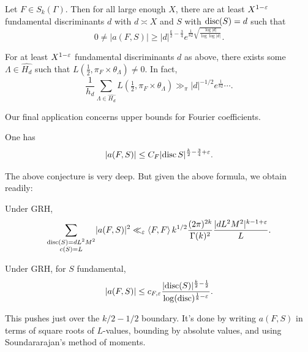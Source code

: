 \documentclass[reqno]{amsart} 
\begin{document}
\begin{theorem} \label{theorem:cnfg5kcowe}
  Let $F \in S_k(\Gamma)$.  Then for all large enough $X$, there are at least $X^{1 - \varepsilon}$ fundamental discriminants $d$ with $d \asymp X$ and $S$ with $\operatorname{disc}(S) = d$ such that
  \begin{equation*}
    0 \neq \lvert a(F, S) \rvert \geq \lvert d \rvert^{\frac{k}{2} - \frac{3}{4}}
    e^{\frac{1}{82} \sqrt{\frac{\log \lvert d \rvert}{\log \log \lvert d \rvert}}}.    
  \end{equation*}
\end{theorem}
\begin{corollary}\label{corollary:cnfg5kcqax}
  For at least $X^{1 - \varepsilon}$ fundamental discriminants $d$ as above, there exists some $\Lambda \in \widehat{H_d}$ such that $L(\tfrac{1}{2}, \pi_F \times \theta_\Lambda) \neq 0$.  In fact,
  \begin{equation*}
    \frac{1}{h_d } \sum_{\Lambda \in \widehat{H_d}} L(\tfrac{1}{2}, \pi_F \times \theta_\Lambda) \gg_\pi \lvert d \rvert^{-1/2} e^{\frac{1}{82}} \dotsb.
  \end{equation*}
\end{corollary}

Our final application concerns upper bounds for Fourier coefficients.
\begin{conjecture}\label{conjecture:cnfg5ktz3k}
  One has
  \begin{equation*}
    \left\lvert a(F, S) \right\rvert \leq C_F \lvert \operatorname{disc} S \rvert^{\frac{k}{2} - \frac{3}{4} + \varepsilon}.
  \end{equation*}
\end{conjecture}
The above conjecture is very deep.  But given the above formula, we obtain readily:
\begin{theorem}\label{theorem:cnfg5nd8f6}
  Under GRH,
  \begin{equation*}
    \sum_{
      \substack{
        \operatorname{disc}(S) = d L^2 M^2 
        \\
        c(S) = L        
      }
    }
    \lvert a(F, S) \rvert^2
    \ll_\varepsilon \left\langle F, F \right\rangle k^{1/2} \frac{(2 \pi )^{2 k }}{\Gamma(k)^2 }
    \frac{\lvert d L^2 M^2 \rvert^{k - 1 + \varepsilon }}{L}.
  \end{equation*}
\end{theorem}

\begin{theorem}\label{theorem:cnfg5nkh9a}
  Under GRH, for $S$ fundamental,
  \begin{equation*}
    \lvert a(F, S) \rvert \leq c_{F, \varepsilon } \frac{\lvert \operatorname{disc} (S) \rvert^{\frac{k}{2} - \frac{1}{2}}}{\log(\operatorname{disc})^{\frac{1}{8} - \varepsilon}}.
  \end{equation*}
\end{theorem}
This pushes just over the $k/2-1/2$ boundary.  It's done by writing $a(F,S)$ in terms of square roots of $L$-values, bounding by absolute values, and using Soundararajan's method of moments.


{} 
\end{document}
